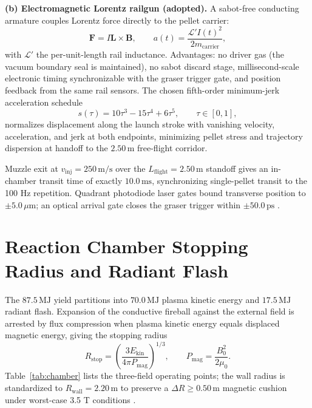 \documentclass[10pt,journal,compsoc]{IEEEtran}
\newcommand{\m}{\,\mathrm{m}}
\newcommand{\MJ}{\,\mathrm{MJ}}
\newcommand{\ms}{\,\mathrm{ms}}
\newcommand{\ps}{\,\mathrm{ps}}
\begin{document}
\textbf{(b) Electromagnetic Lorentz railgun (adopted).} A sabot-free
conducting armature couples Lorentz force directly to the pellet carrier:
\begin{equation}
\mathbf{F} = I\mathbf{L}\times\mathbf{B}, \qquad
a(t) = \frac{\mathcal{L}'I(t)^2}{2m_{\mathrm{carrier}}},
\end{equation}
with $\mathcal{L}'$ the per-unit-length rail inductance. Advantages: no
driver gas (the vacuum boundary seal is maintained), no sabot discard
stage, millisecond-scale electronic timing synchronizable with the graser
trigger gate, and position feedback from the same rail sensors. The chosen
fifth-order minimum-jerk acceleration schedule
\begin{equation}
s(\tau) = 10\tau^3 - 15\tau^4 + 6\tau^5, \qquad \tau \in [0,1],
\label{eq:minjerk}
\end{equation}
normalizes displacement along the launch stroke with vanishing velocity,
acceleration, and jerk at both endpoints, minimizing pellet stress and
trajectory dispersion at handoff to the $2.50\m$ free-flight corridor.

Muzzle exit at $v_{\mathrm{inj}} = 250\,\mathrm{m/s}$ over the
$L_{\mathrm{flight}} = 2.50\m$ standoff gives an in-chamber transit time of
exactly $10.0\ms$, synchronizing single-pellet transit to the 100 Hz
repetition. Quadrant photodiode laser gates bound transverse position to
$\pm5.0\,\mu\mathrm{m}$; an optical arrival gate closes the graser trigger
within $\pm50.0\ps$ \cite{hamamatsu2020}.

\section{Reaction Chamber Stopping Radius and Radiant Flash}
The $87.5\MJ$ yield partitions into $70.0\MJ$ plasma kinetic energy and
$17.5\MJ$ radiant flash. Expansion of the conductive fireball against the
external field is arrested by flux compression when plasma kinetic energy
equals displaced magnetic energy, giving the stopping radius
\begin{equation}
R_{\mathrm{stop}} = \left(\frac{3E_{\mathrm{kin}}}
  {4\pi P_{\mathrm{mag}}}\right)^{1/3},\qquad
P_{\mathrm{mag}} = \frac{B_0^2}{2\mu_0}.
\end{equation}
Table~\ref{tab:chamber} lists the three-field operating points; the wall
radius is standardized to $R_{\mathrm{wall}} = 2.20\m$ to preserve a
$\Delta R \ge 0.50\m$ magnetic cushion under worst-case 3.5 T conditions
\cite{cusp2005}.
\end{document}
